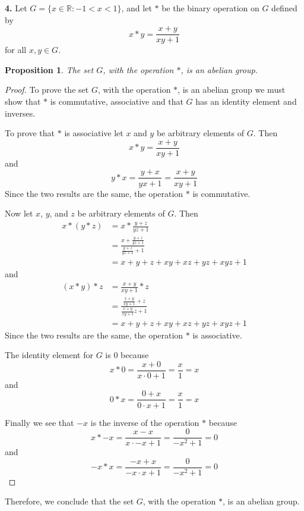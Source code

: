 \documentclass[12pt]{article}   %
\newtheorem*{proposition}{Proposition}  %
\begin{document}
\noindent\textbf{4.} \quad Let $G = \{x \in \mathbb{R}: -1 < x < 1\}$, and let $\ast$ be the binary operation on $G$ defined by
\begin{equation}
x * y = \frac{x + y}{xy + 1}
\end{equation}
for all $x, y \in G$.

\begin{proposition}
The set $G$, with the operation $\ast$, is an abelian group.
\end{proposition}

\begin{proof}
To prove the set $G$, with the operation $\ast$, is an abelian group we must show that $\ast$ is commutative, associative and that $G$ has an identity element and inverses.

To prove that $*$ is associative let $x$ and $y$ be arbitrary elements of $G$. Then
\begin{equation*}
x * y = \frac{x + y}{xy + 1}
\end{equation*}
and
\begin{equation*}
y * x = \frac{y + x}{yx + 1} = \frac{x + y}{xy + 1}
\end{equation*}
Since the two results are the same, the operation $\ast$ is commutative.

Now let $x$, $y$, and $z$ be arbitrary elements of $G$. Then
\begin{align*}
x * (y * z) &= x * \frac{y + z}{yz + 1} \\
&= \frac{x + \frac{y + z}{yz + 1}}{\frac{y + z}{yz + 1} + 1} \\
&= x + y + z + xy + xz + yz + xyz + 1
\end{align*}
and
\begin{align*}
(x * y) * z &= \frac{x + y}{xy + 1} *z \\
&= \frac{\frac{x + y }{xy + 1} + z}{\frac{x + y}{xy + 1}z + 1} \\
&= x + y + z + xy + xz + yz + xyz + 1
\end{align*}
Since the two results are the same, the operation $*$ is associative.

The identity element for $G$ is $0$ because
\begin{equation*}
x * 0 = \frac{x + 0}{x \cdot 0 + 1} = \frac{x}{1} = x
\end{equation*}
and
\begin{equation*}
0 * x = \frac{0 + x}{0 \cdot x + 1} = \frac{x}{1} = x
\end{equation*}

Finally we see that $-x$ is the inverse of the operation $\ast$ because
\begin{equation*}
x * -x = \frac{x - x}{x \cdot -x + 1} = \frac{0}{-x^2 + 1} = 0
\end{equation*}
and
\begin{equation*}
-x * x = \frac{-x + x}{-x \cdot x + 1} = \frac{0}{-x^2 + 1} = 0
\end{equation*}

\end{proof}
Therefore, we conclude that the set $G$, with the operation $\ast$, is an abelian group.
\bigskip
\end{document}
